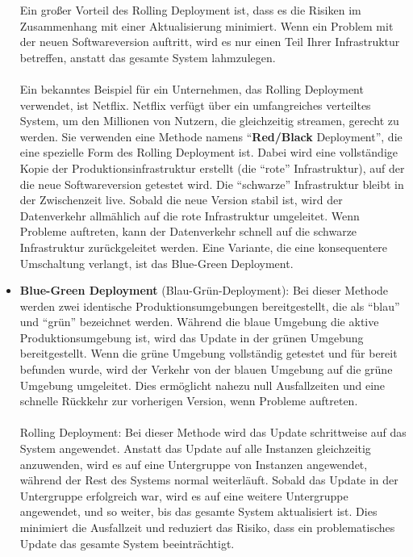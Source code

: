 \documentclass[../vs-script-first-v01.tex]{subfiles}
\begin{document}
\begin{itemize}
\begin{itemize}
\end{itemize} 
Ein großer Vorteil des Rolling Deployment ist, dass es die Risiken im Zusammenhang mit einer Aktualisierung minimiert. Wenn ein Problem mit der neuen Softwareversion auftritt, wird es nur einen Teil Ihrer Infrastruktur betreffen, anstatt das gesamte System lahmzulegen.
\\\\
Ein bekanntes Beispiel für ein Unternehmen, das Rolling Deployment verwendet, ist Netflix. Netflix verfügt über ein umfangreiches verteiltes System, um den Millionen von Nutzern, die gleichzeitig streamen, gerecht zu werden. Sie verwenden eine Methode namens \enquote{\textbf{Red/Black} Deployment}, die eine spezielle Form des Rolling Deployment ist. Dabei wird eine vollständige Kopie der Produktionsinfrastruktur erstellt (die \enquote{rote} Infrastruktur), auf der die neue Softwareversion getestet wird. Die \enquote{schwarze} Infrastruktur bleibt in der Zwischenzeit live. Sobald die neue Version stabil ist, wird der Datenverkehr allmählich auf die rote Infrastruktur umgeleitet. Wenn Probleme auftreten, kann der Datenverkehr schnell auf die schwarze Infrastruktur zurückgeleitet werden. Eine Variante, die eine konsequentere Umschaltung verlangt, ist das Blue-Green Deployment.
\item \textbf{Blue-Green Deployment} (Blau-Grün-Deployment):
Bei dieser Methode werden zwei identische Produktionsumgebungen bereitgestellt, die als \enquote{blau} und \enquote{grün} bezeichnet werden. Während die blaue Umgebung die aktive Produktionsumgebung ist, wird das Update in der grünen Umgebung bereitgestellt. Wenn die grüne Umgebung vollständig getestet und für bereit befunden wurde, wird der Verkehr von der blauen Umgebung auf die grüne Umgebung umgeleitet. Dies ermöglicht nahezu null Ausfallzeiten und eine schnelle Rückkehr zur vorherigen Version, wenn Probleme auftreten.
\\\\
Rolling Deployment: Bei dieser Methode wird das Update schrittweise auf das System angewendet. Anstatt das Update auf alle Instanzen gleichzeitig anzuwenden, wird es auf eine Untergruppe von Instanzen angewendet, während der Rest des Systems normal weiterläuft. Sobald das Update in der Untergruppe erfolgreich war, wird es auf eine weitere Untergruppe angewendet, und so weiter, bis das gesamte System aktualisiert ist. Dies minimiert die Ausfallzeit und reduziert das Risiko, dass ein problematisches Update das gesamte System beeinträchtigt.
\\\\

\end{itemize}
\end{document}

